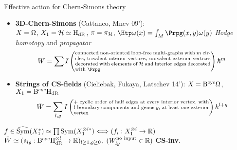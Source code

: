 \documentclass[xcolor=dvipsnames]{beamer}
\theoremstyle{plain}
\renewcommand{\emph}[1]{{\itshape\color{pink}#1}}
\newcommand{\emphbf}[1]{{\bfseries\color{YellowGreen}#1}}
\begin{document}
\begin{frame}{Effective action for Chern-Simons theory}
\begin{itemize}
\item \emphbf{3D-Chern-Simons} (Cattaneo, Mnev 09'): \\
$X=\Omega$, $X_1 = \mathcal{H} \simeq \mathrm{H}_{\mathrm{dR}}$, $\pi = \pi_{\mathcal{H}}$, $\Htp \omega(x) = \int_M \Prpg(x,y) \omega(y)$ \emph{Hodge homotopy} and \emph{propagator}
$$ W = \sum I\left(\parbox{7cm}{\scriptsize connected non-oriented loop-free multi-graphs with $m$ circles, trivalent interior vertices, univalent exterior vertices decorated with elements of $\Harm$ and interior edges decorated with 
$\Prpg$}\right)\hbar^{m} $$\pause
\item \emphbf{Strings of CS-fields} (Cieliebak, Fukaya, Latschev 14'): $X=\mathrm{B}^{\mathrm{cyc}} \Omega$, $X_1 = \mathrm{B}^{\mathrm{cyc}} \mathrm{H}_{\mathrm{dR}}$
$$ \bar{W}= \sum_{l,g} I\left(\parbox{7cm}{\scriptsize + cyclic order of half edges at every interior vertex,~with $l$ boundary components and genus $g$, at least one exterior vertex}\right) \hbar^{l+g} $$
\end{itemize}\pause
\parbox[t]{10cm}{$f \in \widehat{\text{Sym}}(X_1^*) \simeq \prod \text{Sym}(X_1^{\otimes i*}) \Longleftrightarrow (f_{i}: X_1^{\otimes i} \rightarrow \mathbb{R})$ \\[.3cm] $\bar{W} \simeq ({\mathfrak{n}}_{lg}: \mathrm{B}^{\mathrm{cyc}}\mathrm{H}_{\mathrm{dR}}^{\otimes l}\rightarrow \mathbb{R})_{l\ge 1, g\ge 0}$, $(W^{\text{no input}}_{lg}\in \mathbb{R})$ \emphbf{CS-inv.}}
\end{frame}
\end{document}
